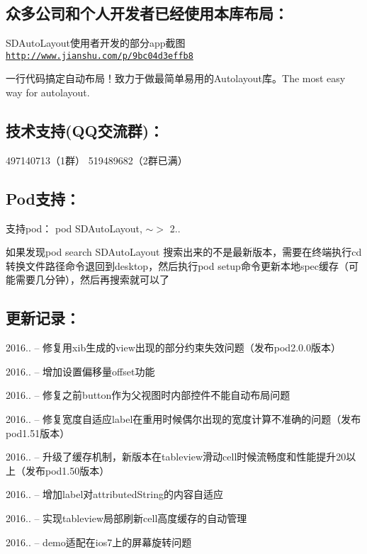 \subsection*{众多公司和个人开发者已经使用本库布局：}

S\+D\+Auto\+Layout使用者开发的部分app截图 \href{http://www.jianshu.com/p/9bc04d3effb8}{\tt http\+://www.\+jianshu.\+com/p/9bc04d3effb8}

一行代码搞定自动布局！致力于做最简单易用的\+Autolayout库。\+The most easy way for autolayout.

\subsection*{技术支持(Q\+Q交流群)：}

497140713（1群） 519489682（2群已满）

\subsection*{Pod支持：}

支持pod： pod \textquotesingle{}S\+D\+Auto\+Layout\textquotesingle{}, \textquotesingle{}$\sim$$>$ 2..\textquotesingle{}

如果发现pod search S\+D\+Auto\+Layout 搜索出来的不是最新版本，需要在终端执行cd转换文件路径命令退回到desktop，然后执行pod setup命令更新本地spec缓存（可能需要几分钟），然后再搜索就可以了

\subsection*{更新记录：}

2016.. -- 修复用xib生成的view出现的部分约束失效问题（发布pod2.0.\+0版本）

2016.. -- 增加设置偏移量offset功能

2016.. -- 修复之前button作为父视图时内部控件不能自动布局问题

2016.. -- 修复宽度自适应label在重用时候偶尔出现的宽度计算不准确的问题（发布pod1.51版本）

2016.. -- 升级了缓存机制，新版本在tableview滑动cell时候流畅度和性能提升20以上（发布pod1.50版本）

2016.. -- 增加label对attributed\+String的内容自适应

2016.. -- 实现tableview局部刷新cell高度缓存的自动管理

2016.. -- demo适配在ios7上的屏幕旋转问题

